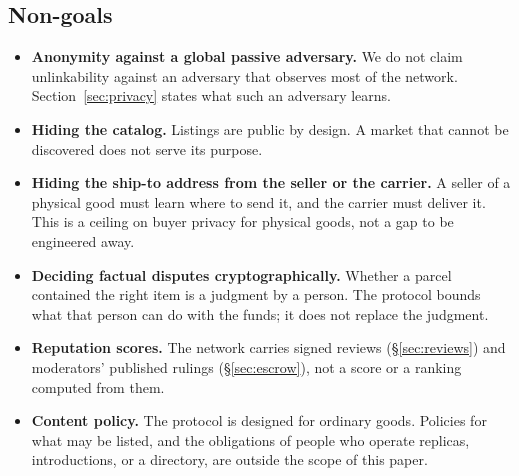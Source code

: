 \subsection{Non-goals}

\begin{itemize}
  \item \textbf{Anonymity against a global passive adversary.} We do not claim unlinkability against an adversary that observes most of the network. Section~\ref{sec:privacy} states what such an adversary learns.
  \item \textbf{Hiding the catalog.} Listings are public by design. A market that cannot be discovered does not serve its purpose.
  \item \textbf{Hiding the ship-to address from the seller or the carrier.} A seller of a physical good must learn where to send it, and the carrier must deliver it. This is a ceiling on buyer privacy for physical goods, not a gap to be engineered away.
  \item \textbf{Deciding factual disputes cryptographically.} Whether a parcel contained the right item is a judgment by a person. The protocol bounds what that person can do with the funds; it does not replace the judgment.
  \item \textbf{Reputation scores.} The network carries signed reviews (\S\ref{sec:reviews}) and moderators' published rulings (\S\ref{sec:escrow}), not a score or a ranking computed from them.
  \item \textbf{Content policy.} The protocol is designed for ordinary goods. Policies for what may be listed, and the obligations of people who operate replicas, introductions, or a directory, are outside the scope of this paper.
\end{itemize}
